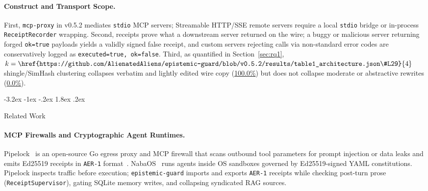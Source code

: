 \documentclass[10pt,twocolumn]{article}
\makeatletter
\renewcommand\section{\@startsection{section}{1}{\z@}%
  {-3.2ex \@plus -1ex \@minus -.2ex}%
  {1.8ex \@plus .2ex}%
  {\normalfont\Large\bfseries\raggedright}}
\makeatother
\begin{document}
\paragraph{Construct and Transport Scope.}
First, \texttt{mcp-proxy} in v0.5.2 mediates \texttt{stdio} MCP servers; Streamable HTTP/SSE remote servers require a local \texttt{stdio} bridge or in-process \texttt{ReceiptRecorder} wrapping. Second, receipts prove what a downstream server returned on the wire; a buggy or malicious server returning forged \texttt{ok=true} payloads yields a validly signed false receipt, and custom servers rejecting calls via non-standard error codes are conservatively logged as \texttt{executed=true, ok=false}. Third, as quantified in Section~\ref{sec:rq1}, $k=\href{https://github.com/AlienatedAliens/epistemic-guard/blob/v0.5.2/results/table1_architecture.json\#L29}{4}$ shingle/SimHash clustering collapses verbatim and lightly edited wire copy (\href{https://github.com/AlienatedAliens/epistemic-guard/blob/v0.5.2/results/table2_conformance.json\#L77}{100.0\%}) but does not collapse moderate or abstractive rewrites (\href{https://github.com/AlienatedAliens/epistemic-guard/blob/v0.5.2/results/table2_conformance.json\#L78}{0.0\%}).

\section{Related Work}
\label{sec:related}

\paragraph{MCP Firewalls and Cryptographic Agent Runtimes.}
Pipelock~\cite{pipelock2026} is an open-source Go egress proxy and MCP firewall that scans outbound tool parameters for prompt injection or data leaks and emits Ed25519 receipts in \texttt{AER-1} format~\cite{zambo2026aer1}. NabaOS~\cite{nabaos2026} runs agents inside OS sandboxes governed by Ed25519-signed YAML constitutions. Pipelock inspects traffic before execution; \texttt{epistemic-guard} imports and exports \texttt{AER-1} receipts while checking post-turn prose (\texttt{ReceiptSupervisor}), gating SQLite memory writes, and collapsing syndicated RAG sources.
\end{document}
